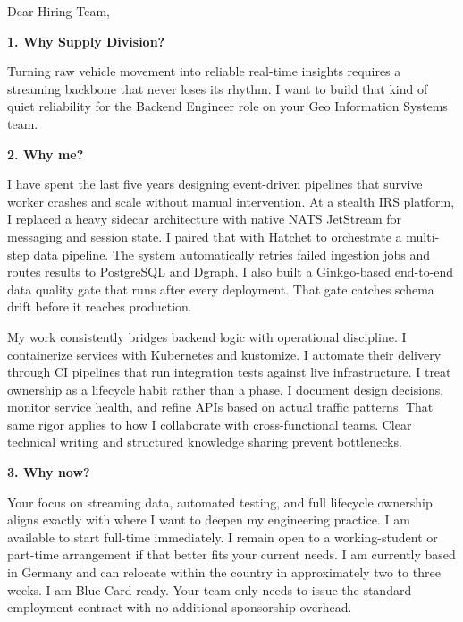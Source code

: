 \documentclass[11pt,a4paper]{coverletter}
\begin{document}

\opening{Dear Hiring Team,}

\vspace{8pt}\noindent\textbf{1. Why Supply Division?}\par\vspace{3pt}

Turning raw vehicle movement into reliable real-time insights requires a streaming backbone that never loses its rhythm. I want to build that kind of quiet reliability for the Backend Engineer role on your Geo Information Systems team.

\vspace{8pt}\noindent\textbf{2. Why me?}\par\vspace{3pt}

I have spent the last five years designing event-driven pipelines that survive worker crashes and scale without manual intervention. At a stealth IRS platform, I replaced a heavy sidecar architecture with native NATS JetStream for messaging and session state. I paired that with Hatchet to orchestrate a multi-step data pipeline. The system automatically retries failed ingestion jobs and routes results to PostgreSQL and Dgraph. I also built a Ginkgo-based end-to-end data quality gate that runs after every deployment. That gate catches schema drift before it reaches production.

My work consistently bridges backend logic with operational discipline. I containerize services with Kubernetes and kustomize. I automate their delivery through CI pipelines that run integration tests against live infrastructure. I treat ownership as a lifecycle habit rather than a phase. I document design decisions, monitor service health, and refine APIs based on actual traffic patterns. That same rigor applies to how I collaborate with cross-functional teams. Clear technical writing and structured knowledge sharing prevent bottlenecks.

\vspace{8pt}\noindent\textbf{3. Why now?}\par\vspace{3pt}

Your focus on streaming data, automated testing, and full lifecycle ownership aligns exactly with where I want to deepen my engineering practice. I am available to start full-time immediately. I remain open to a working-student or part-time arrangement if that better fits your current needs. I am currently based in Germany and can relocate within the country in approximately two to three weeks. I am Blue Card-ready. Your team only needs to issue the standard employment contract with no additional sponsorship overhead.
\end{document}
